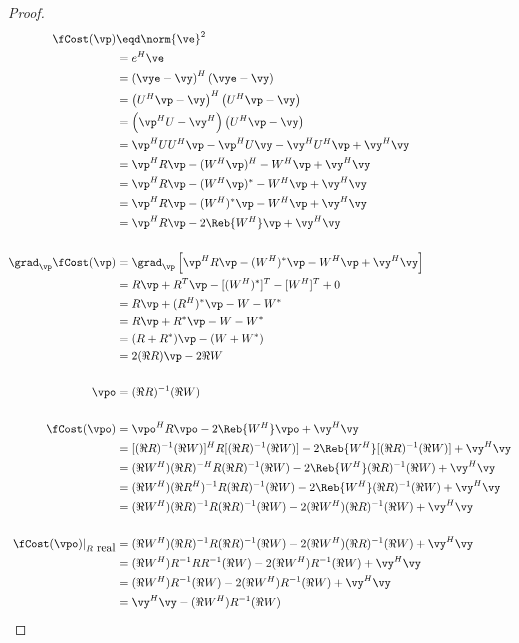 {\begin{proof}
\begin{align*}
   \fCost(\vp)
     &\eqd \norm{\ve}^2
   \\&=    e^H\ve
   \\&=    \left(\vye-\vy\right)^H\left(\vye-\vy\right)
   \\&=    \left(U^H\vp-\vy\right)^H\left(U^H\vp-\vy\right)
   \\&=    \left(\vp^HU-\vy^H\right)\left(U^H\vp-\vy\right)
   \\&=    \vp^HUU^H\vp - \vp^HU\vy -\vy^HU^H\vp + \vy^H\vy
   \\&=    \vp^H R \vp - (W^H\vp)^H -W^H\vp + \vy^H\vy
   \\&=    \vp^H R \vp - (W^H\vp)^\ast -W^H\vp + \vy^H\vy
   \\&=    \vp^H R \vp - (W^H)^\ast\vp -W^H\vp + \vy^H\vy
   \\&=    \vp^H R \vp - 2\Reb{W^H}\vp + \vy^H\vy
\\
\\
   \grad_\vp \fCost(\vp)
     &= \grad_\vp \left[ \vp^H R \vp - (W^H)^\ast\vp -W^H\vp + \vy^H\vy \right]
   \\&= R\vp + R^T\vp - [(W^H)^\ast]^T - [W^H]^T + 0
   \\&= R\vp + (R^H)^\ast\vp - W - W^\ast
   \\&= R\vp + R^\ast\vp - W - W^\ast
   \\&= (R + R^\ast)\vp - (W + W^\ast)
   \\&= 2(\Re{R})\vp - 2\Re{W}
\\
\\
   \vpo
     &= (\Re{R})^{-1}(\Re{W})
\\
\\
   \fCost(\vpo)
     &=    \vpo^H R \vpo - 2\Reb{W^H}\vpo + \vy^H\vy
   \\&=    [(\Re{R})^{-1}(\Re{W})]^H R [(\Re{R})^{-1}(\Re{W})] - 2\Reb{W^H}[(\Re{R})^{-1}(\Re{W})] + \vy^H\vy
   \\&=    (\Re{W^H})(\Re{R})^{-H} R (\Re{R})^{-1}(\Re{W})     - 2\Reb{W^H}(\Re{R})^{-1}(\Re{W})       + \vy^H\vy
   \\&=    (\Re{W^H})(\Re{R^H})^{-1} R (\Re{R})^{-1}(\Re{W})   - 2\Reb{W^H}(\Re{R})^{-1}(\Re{W})     + \vy^H\vy
   \\&=    (\Re{W^H})(\Re{R})^{-1} R (\Re{R})^{-1}(\Re{W})     - 2(\Re{W^H})(\Re{R})^{-1}(\Re{W})      + \vy^H\vy
\\
\\
   \fCost(\vpo)|_{R\mbox{ real}}
     &=    (\Re{W^H})(\Re{R})^{-1} R (\Re{R})^{-1}(\Re{W}) - 2(\Re{W^H})(\Re{R})^{-1}(\Re{W}) + \vy^H\vy
   \\&=    (\Re{W^H})R^{-1} R R^{-1}(\Re{W}) - 2(\Re{W^H})R^{-1}(\Re{W}) + \vy^H\vy
   \\&=    (\Re{W^H}) R^{-1}(\Re{W}) - 2(\Re{W^H})R^{-1}(\Re{W}) + \vy^H\vy
   \\&=    \vy^H\vy - (\Re{W^H})R^{-1}(\Re{W})
\end{align*}
\end{proof}


}
